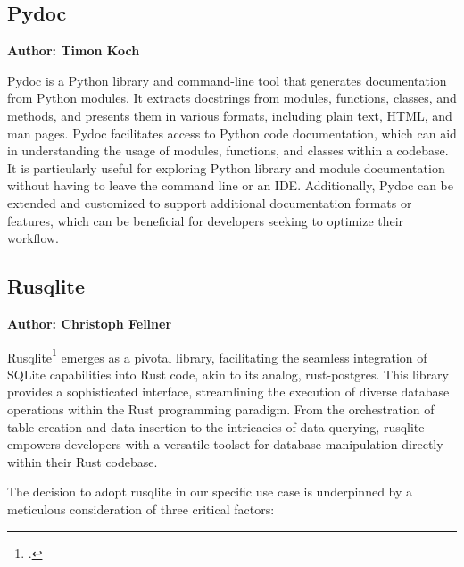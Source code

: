 \subsection{Pydoc}
\textbf{Author: Timon Koch}

Pydoc is a Python library and command-line tool that generates documentation from Python modules. It extracts docstrings from modules, functions, classes, and methods, and presents them in various formats, including plain text, HTML, and man pages.  Pydoc facilitates access to Python code documentation, which can aid in understanding the usage of modules, functions, and classes within a codebase. It is particularly useful for exploring Python library and module documentation without having to leave the command line or an IDE. Additionally, Pydoc can be extended and customized to support additional documentation formats or features, which can be beneficial for developers seeking to optimize their workflow. 

\subsection{Rusqlite}
\textbf{Author: Christoph Fellner}

Rusqlite\footcite{rusqlite} emerges as a pivotal library, facilitating the seamless integration of SQLite capabilities into Rust code, akin to its analog, 
rust-postgres. This library provides a sophisticated interface, streamlining the execution of diverse database operations within the Rust programming paradigm. 
From the orchestration of table creation and data insertion to the intricacies of data querying, rusqlite empowers developers with a versatile toolset for 
database manipulation directly within their Rust codebase.

The decision to adopt rusqlite in our specific use case is underpinned by a meticulous consideration of three critical factors:

